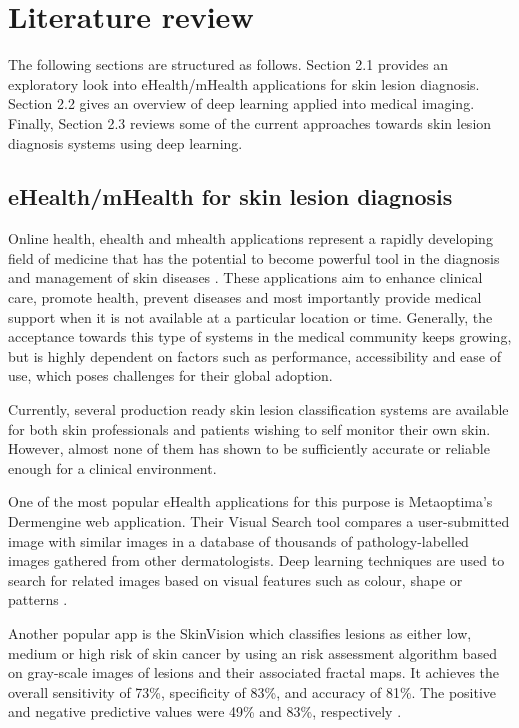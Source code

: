 \documentclass[journal,compsoc]{IEEEtran}
\begin{document}
\section{Literature review}
The following sections are structured as follows. Section 2.1 provides an exploratory look into eHealth/mHealth applications for skin lesion diagnosis. Section 2.2 gives an overview of deep learning applied into medical imaging. Finally, Section 2.3 reviews some of the current approaches towards skin lesion diagnosis systems using deep learning. 
\subsection{eHealth/mHealth for skin lesion diagnosis}
Online health, ehealth and mhealth applications represent a rapidly developing field of medicine that has the potential to become powerful tool in the diagnosis and management of skin diseases \cite{Jaworek-Korjakowska2018}. These applications aim to enhance clinical care, promote health, prevent diseases and most importantly provide medical support when it is not available at a particular location or time. Generally, the acceptance towards this type of systems in the medical community keeps growing, but is highly dependent on factors such as performance, accessibility and ease of use, which poses challenges for their global adoption. \par
Currently, several production ready skin lesion classification systems are  available for both skin professionals and patients wishing to self monitor their own skin. However, almost none of them has shown to be sufficiently accurate or reliable enough for a clinical environment. \par 
One of the most popular eHealth applications for this purpose is Metaoptima's Dermengine web application. Their Visual Search tool compares a user-submitted image with similar images in a database of thousands of pathology-labelled images gathered from  other dermatologists. Deep learning techniques are used to search for related images based on visual features such as colour, shape or patterns \cite{dermengine}. \par
Another popular app is the SkinVision which classifies lesions as either low, medium or high risk of skin cancer by using an risk assessment algorithm based on gray-scale images of lesions and their associated fractal maps. It achieves the overall sensitivity of 73\%, specificity of 83\%, and accuracy of 81\%. The positive and negative predictive values were 49\% and 83\%, respectively \cite{Jaworek-Korjakowska2018}.
\end{document}
